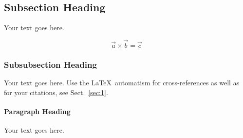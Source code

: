 \subsection{Subsection Heading}
\label{sec:2}
Your text goes here.

\begin{equation}
\vec{a}\times\vec{b}=\vec{c}
\end{equation}

\subsubsection{Subsubsection Heading}
Your text goes here. Use the \LaTeX\ automatism for cross-references as
well as for your citations, see Sect.~\ref{sec:1}.

\paragraph{Paragraph Heading} %
Your text goes here.

